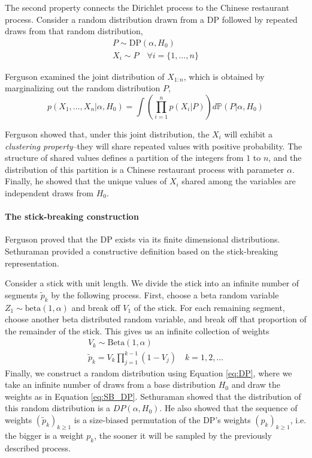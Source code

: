 The second property connects the Dirichlet process to the Chinese restaurant process. Consider a random distribution drawn from a DP followed by repeated draws from that random distribution,
\begin{gather}
P \sim \text{DP}(\alpha, H_0) \\
X_i \sim P \quad \forall i= \{1,\dots,n\} \label{eq:CRP}
\end{gather}

Ferguson \cite{ferguson73} examined the joint distribution of $X_{1:n}$, which is obtained by marginalizing out the random distribution $P$,
\begin{equation}
p(X_1,\dots,X_n|\alpha,H_0) = \int{\left(\prod_{i=1}^n p(X_i|P) \right) d \mathbb{P}(P|\alpha,H_0)}
\end{equation}

Ferguson showed that, under this joint distribution, the $X_i$ will exhibit a \textit{clustering property}--they will share repeated values with positive probability. The structure of shared values defines a partition of the integers from $1$ to $n$, and the distribution of this partition is a Chinese restaurant process with parameter $\alpha$. Finally, he showed that the unique values of $X_i$ shared among the variables are independent draws from $H_0$.

\paragraph{The stick-breaking construction}
Ferguson \cite{ferguson73} proved that the \gls{DP} exists via its finite dimensional distributions. Sethuraman \cite{sethuraman94} provided a constructive definition based on the stick-breaking representation.

Consider a stick with unit length. We divide the stick into an infinite number of segments $\tilde{p}_k$ by the following process. First, choose a beta random variable $Z_1 \sim \text{beta}(1, \alpha)$ and break off $V_1$ of the stick. For each remaining segment, choose another beta distributed random variable, and break off that proportion of the remainder of the stick. This gives us an infinite collection of weights 
\begin{gather}
V_k \sim \text{Beta}(1, \alpha) \\
\tilde{p}_k = V_k \prod_{j=1}^{k-1}(1-V_j) \quad k= 1,2,\dots \label{eq:SB_DP}
\end{gather}
Finally, we construct a random distribution using Equation \ref{eq:DP}, where we take an infinite number of draws from a base distribution $H_0$ and draw the weights as in Equation \ref{eq:SB_DP}. Sethuraman \cite{sethuraman94} showed that the distribution of this random distribution is a $DP(\alpha,H_0)$. He also showed that the sequence of weights $(\tilde{p}_k)_{k \ge 1}$ is a size-biased permutation of the \gls{DP}'s weights $({p}_k)_{k \ge 1}$, i.e. the bigger is a weight ${p}_k$, the sooner it will be sampled by the previously described process.

